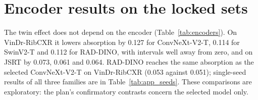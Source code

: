 \section{Encoder results on the locked sets}
The twin effect does not depend on the encoder (Table~\ref{tab:encoders}). On VinDr-RibCXR it lowers absorption by 0.127 for ConvNeXt-V2-T,
0.114 for SwinV2-T and 0.112 for RAD-DINO, with intervals well away from zero, and on JSRT by 0.073, 0.061 and 0.064. RAD-DINO reaches the same
absorption as the selected ConvNeXt-V2-T on VinDr-RibCXR (0.053 against 0.051); single-seed results of all three families are in
Table~\ref{tab:app_seeds}. These comparisons are exploratory: the plan's confirmatory contrasts concern the selected model only.
\begin{table}[htbp]
\centering\small
\caption{Twin regulariser per encoder on the locked audit sets (exploratory): absorption difference to the matched no-twin control and its
interaction with bone overlap.}
\label{tab:encoders}
\end{table}
